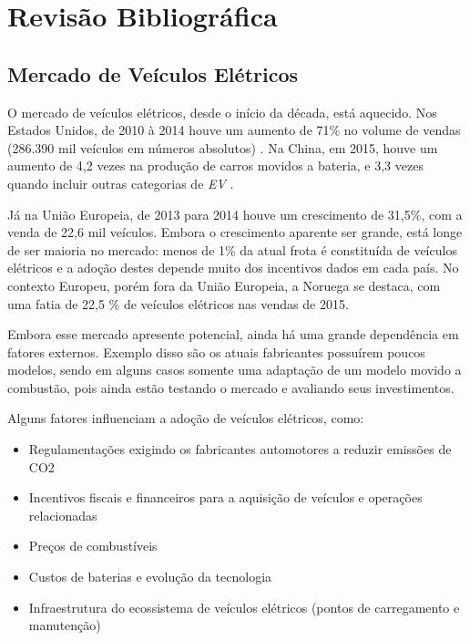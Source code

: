 \chapter{Revisão Bibliográfica}
\label{stateofart}

  \section{Mercado de Veículos Elétricos}
  \label{stateofart:market}

    O mercado de veículos elétricos, desde o início da década, está aquecido. Nos Estados Unidos, de 2010 à 2014 houve um aumento de 71\% no volume de vendas (286.390 mil veículos em números absolutos) \cite{fsec-report-ev}. Na China, em 2015, houve um aumento de 4,2 vezes na produção de carros movidos a bateria, e 3,3 vezes quando incluir outras categorias de \textit{\ac{EV}} \cite{caam-report-ev}.

    Já na União Europeia, de 2013 para 2014 houve um crescimento de 31,5\%, com a venda de 22,6 mil veículos. Embora o crescimento aparente ser grande, está longe de ser maioria no mercado: menos de 1\% da atual frota é constituída de veículos elétricos e a adoção destes depende muito dos incentivos dados em cada país. No contexto Europeu, porém fora da União Europeia, a Noruega se destaca, com uma fatia de 22,5 \% de veículos elétricos nas vendas de 2015. \cite{eaa-report-ev}

    Embora esse mercado apresente potencial, ainda há uma grande dependência em fatores externos. Exemplo disso são os atuais fabricantes possuírem poucos modelos, sendo em alguns casos somente uma adaptação de um modelo movido a combustão, pois ainda estão testando o mercado e avaliando seus investimentos.

    Alguns fatores influenciam a adoção de veículos elétricos, como:

    \begin{itemize}
      \item Regulamentações exigindo os fabricantes automotores a reduzir emissões de CO2
      \item Incentivos fiscais e financeiros para a aquisição de veículos e operações relacionadas
      \item Preços de combustíveis
      \item Custos de baterias e evolução da tecnologia
      \item Infraestrutura do ecossistema de veículos elétricos (pontos de carregamento e manutenção)
    \end{itemize}

